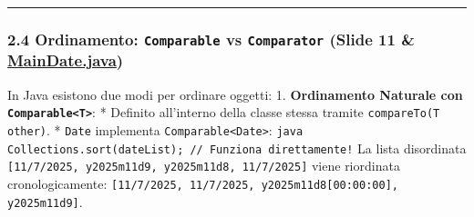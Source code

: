\documentclass[11pt,a4paper]{article}
\newcommand{\passthrough}[1]{#1}
\begin{document}
\begin{center}\rule{0.5\linewidth}{0.5pt}\end{center}

\subsubsection{\texorpdfstring{2.4 Ordinamento: \texttt{Comparable} vs
\texttt{Comparator} (Slide 11 \&
\href{file:///home/wally/Documenti/GitHub/Programmazione-II/25-26/Teoria-e-Esercitazioni/Codice-20260902/Lezione15/MavenDate/src/main/java/it/oop/ui/MainDate.java\#L70-L88}{MainDate.java})}{2.4 Ordinamento: Comparable vs Comparator (Slide 11 \& MainDate.java)}}\label{ordinamento-comparable-vs-comparator-slide-11-maindate.java}

In Java esistono due modi per ordinare oggetti: 1. \textbf{Ordinamento
Naturale con \passthrough{\lstinline!Comparable<T>!}}: * Definito
all'interno della classe stessa tramite
\passthrough{\lstinline!compareTo(T other)!}. *
\passthrough{\lstinline!Date!} implementa
\passthrough{\lstinline!Comparable<Date>!}:
\passthrough{\lstinline"java      Collections.sort(dateList); // Funziona direttamente!"}
La lista disordinata
\passthrough{\lstinline![11/7/2025, y2025m11d9, y2025m11d8, 11/7/2025]!}
viene riordinata cronologicamente:
\passthrough{\lstinline![11/7/2025, 11/7/2025, y2025m11d8[00:00:00], y2025m11d9]!}.
\end{document}
